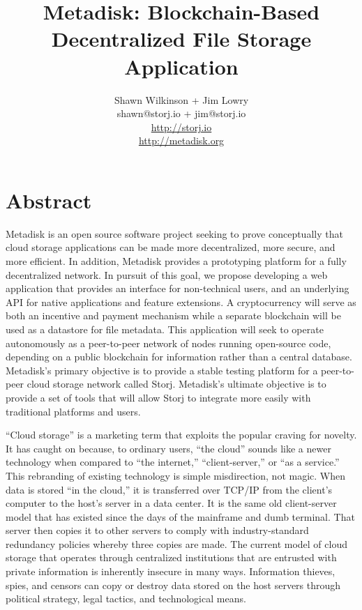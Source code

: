 \documentclass[a4paper,10pt]{article}
\begin{document}
\lstset{basicstyle=\ttfamily\footnotesize,breaklines=true}
\lstset{numbers=left, numberstyle=\tiny, stepnumber=1, numbersep=5pt}
\lstset{language=TeX}


\title{\large \bf Metadisk:  Blockchain-Based Decentralized File Storage Application}
\author{\small Shawn Wilkinson + Jim Lowry\\ \small shawn@storj.io + jim@storj.io \\  \small \url{http://storj.io} \\  \small \url{http://metadisk.org}}
\maketitle

\section*{Abstract}
Metadisk is an open source software project seeking to prove conceptually that cloud storage applications can be made more decentralized, more secure, and more efficient. In addition, Metadisk provides a prototyping platform for a fully decentralized network. In pursuit of this goal, we propose developing a web application that provides an interface for non-technical users, and an underlying API for native applications and feature extensions. A cryptocurrency will serve as both an incentive and payment mechanism while a separate blockchain will be used as a datastore for file metadata. This application will seek to operate autonomously as a peer-to-peer network of nodes running open-source code, depending on a public blockchain for information rather than a central database. Metadisk’s primary objective is to provide a stable testing platform for a peer-to-peer cloud storage network called Storj. Metadisk’s ultimate objective is to provide a set of tools that will allow Storj to integrate more easily with traditional platforms and users. 



“Cloud storage” is a marketing term that exploits the popular craving for novelty. It has caught on because, to ordinary users, “the cloud” sounds like a newer technology when compared to “the internet,” “client-server,” or “as a service.” This rebranding of existing technology is simple misdirection, not magic.  When data is stored “in the cloud,” it is transferred over TCP/IP from the client’s computer to the host’s server in a data center.  It is the same old client-server model that has existed since the days of the mainframe and dumb terminal. That server then copies it to other servers to comply with industry-standard redundancy policies whereby three copies are made. The current model of cloud storage that operates through centralized institutions that are entrusted with private information is inherently insecure in many ways.  Information thieves, spies, and censors can copy or destroy data stored on the host servers through political strategy, legal tactics, and technological means. \\
\end{document}

